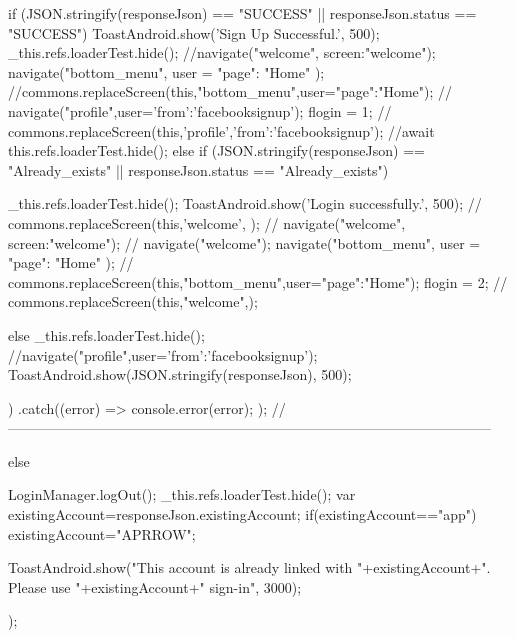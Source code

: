 {{{{{{{{{{{{                      if (JSON.stringify(responseJson) == "SUCCESS" || responseJson.status == "SUCCESS") {
                        ToastAndroid.show('Sign Up Successful.', 500);
                         _this.refs.loaderTest.hide();
                        //navigate("welcome",{ screen:"welcome"});   
                        navigate("bottom_menu", user = { "page": "Home" });
                        //commons.replaceScreen(this,"bottom_menu",user={"page":"Home"});                     
                        // navigate("profile",user={'from':'facebooksignup'}); 
                        flogin = 1;
                        //    commons.replaceScreen(this,'profile',{'from':'facebooksignup'});
                        //await this.refs.loaderTest.hide();
                      }
                      else if (JSON.stringify(responseJson) == "Already_exists" || responseJson.status == "Already_exists") {
                         _this.refs.loaderTest.hide();
                        ToastAndroid.show('Login successfully.', 500);
                        // commons.replaceScreen(this,'welcome', {});                                                
                        // navigate("welcome",{ screen:"welcome"});  
                        // navigate("welcome"); 
                        navigate("bottom_menu", user = { "page": "Home" });
                        // commons.replaceScreen(this,"bottom_menu",user={"page":"Home"}); 
                        flogin = 2;
                        //  commons.replaceScreen(this,"welcome",{});   
                                               
                      }
                      else {
                         _this.refs.loaderTest.hide();
                        //navigate("profile",user={'from':'facebooksignup'});                    
                        ToastAndroid.show(JSON.stringify(responseJson), 500);
                      }
                    })
                    .catch((error) => {
                      console.error(error);
                    });
                  //--------------------------------------------------------------------------------------------------------
                  }
                  else
                  {
                    LoginManager.logOut();   
                    _this.refs.loaderTest.hide();
                    var existingAccount=responseJson.existingAccount;
                    if(existingAccount=="app")
                        existingAccount="APRROW";
   
                     ToastAndroid.show("This account is already linked with "+existingAccount+". Please use "+existingAccount+" sign-in", 3000);
                  }
                });

}}}}}}}}}
